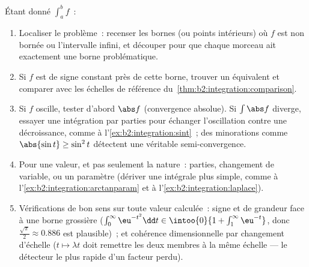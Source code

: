 \begin{method}\label{met:b2:integration:study}
Étant donné $\int_a^b f$~:
\begin{enumerate}
  \item Localiser le problème~: recenser les bornes (ou points
        intérieurs) où $f$ est non bornée ou l'intervalle
        infini, et découper pour que chaque morceau ait exactement une
        borne problématique.
  \item Si $f$ est de signe constant près de cette borne, trouver un
        équivalent et comparer avec les échelles de référence du~\cref{thm:b2:integration:comparison}.
  \item Si $f$ oscille, tester d'abord $\abs f$ (convergence
        absolue). Si $\int\abs f$ diverge, essayer une intégration
        par parties pour échanger l'oscillation contre une décroissance, comme à
        l'\cref{ex:b2:integration:sint}~; des minorations comme
        $\abs{\sin t} \geq \sin^2t$ détectent une véritable
        semi-convergence.
  \item Pour une valeur, et pas seulement la nature~: parties, changement de variable,
        ou un paramètre (dériver une intégrale plus simple, comme à
        l'\cref{ex:b2:integration:arctanparam} et à
        l'\cref{ex:b2:integration:laplace}).
  \item Vérifications de bon sens sur toute valeur calculée~: signe et  de grandeur
        face à une borne grossière ($\int_0^\infty
        \eu^{-t^2}\dd t \in \intoo{0}{1 + \int_1^\infty
        \eu^{-t}}$, donc $\frac{\sqrt\pi}{2} \approx 0.886$ est
        plausible)~; et cohérence dimensionnelle par changement d'échelle
        ($t \mapsto \lambda t$ doit remettre les deux membres à la même
        échelle --- le détecteur le plus rapide d'un facteur perdu).
\end{enumerate}
\end{method}

